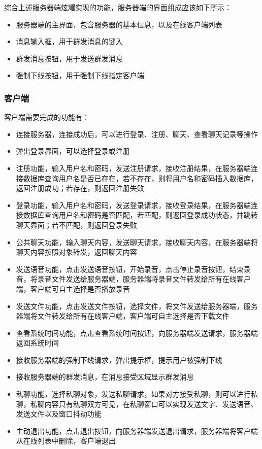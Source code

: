 \documentclass[UTF8,12pt]{article}
\begin{document}
综合上述服务器端炫耀实现的功能，服务器端的界面组成应该如下所示：
\begin{itemize}
    \item 服务器端的主界面，包含服务器的基本信息，以及在线客户端列表
    \item 消息输入框，用于群发消息的键入
    \item 群发消息按钮，用于发送群发消息
    \item 强制下线按钮，用于强制下线指定客户端
\end{itemize}

\subsubsection{客户端}
客户端需要完成的功能有：
\begin{itemize}
    \item 连接服务器，连接成功后，可以进行登录、注册、聊天、查看聊天记录等操作
    \item 弹出登录界面，可以选择登录或注册
    \item 注册功能，输入用户名和密码，发送注册请求，接收注册结果，在服务器端连接数据库查询用户名是否已存在，若不存在，则将用户名和密码插入数据库，返回注册成功；若存在，则返回注册失败
    \item 登录功能，输入用户名和密码，发送登录请求，接收登录结果，在服务器端连接数据库查询用户名和密码是否匹配，若匹配，则返回登录成功状态，并跳转聊天界面；若不匹配，则返回登录失败
    \item 公共聊天功能，输入聊天内容，发送聊天请求，接收聊天内容，在服务器端将聊天内容按照对象转发，返回聊天内容
    \item 发送语音功能，点击发送语音按钮，开始录音，点击停止录音按钮，结束录音，将录音文件发送给服务器端，服务器端将录音文件转发给所有在线客户端，客户端可自主选择是否播放录音
    \item 发送文件功能，点击发送文件按钮，选择文件，将文件发送给服务器端，服务器端将文件转发给所有在线客户端，客户端可自主选择是否下载文件
    \item 查看系统时间功能，点击查看系统时间按钮，向服务器端发送请求，服务器端返回系统时间
    \item 接收服务器端的强制下线请求，弹出提示框，提示用户被强制下线
    \item 接收服务器端的群发消息，在消息接受区域显示群发消息
    \item 私聊功能，选择私聊对象，发送私聊请求，如果对方接受私聊，则可以进行私聊，私聊内容只有私聊双方可见，在私聊窗口可以实现发送文字、发送语音、发送文件以及窗口抖动功能
    \item 主动退出功能，点击退出按钮，向服务器端发送退出请求，服务器端将客户端从在线列表中删除，客户端退出    
\end{itemize}
\end{document}

